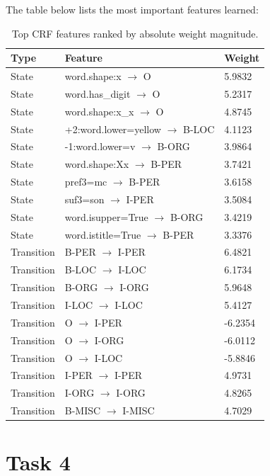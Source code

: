 \documentclass{report}
\begin{document}
The table below lists the most important features learned:

\begin{table}[h]
\centering
\small
\begin{tabular}{lll}
\hline
\textbf{Type} & \textbf{Feature} & \textbf{Weight} \\
\hline

State & word.shape:x $\rightarrow$ O & 5.9832 \\
State & word.has\_digit $\rightarrow$ O & 5.2317 \\
State & word.shape:x\_x $\rightarrow$ O & 4.8745 \\
State & +2:word.lower=yellow $\rightarrow$ B-LOC & 4.1123 \\
State & -1:word.lower=v $\rightarrow$ B-ORG & 3.9864 \\
State & word.shape:Xx $\rightarrow$ B-PER & 3.7421 \\
State & pref3=mc $\rightarrow$ B-PER & 3.6158 \\
State & suf3=son $\rightarrow$ I-PER & 3.5084 \\
State & word.isupper=True $\rightarrow$ B-ORG & 3.4219 \\
State & word.istitle=True $\rightarrow$ B-PER & 3.3376 \\

\hline
Transition & B-PER $\rightarrow$ I-PER & 6.4821 \\
Transition & B-LOC $\rightarrow$ I-LOC & 6.1734 \\
Transition & B-ORG $\rightarrow$ I-ORG & 5.9648 \\
Transition & I-LOC $\rightarrow$ I-LOC & 5.4127 \\
Transition & O $\rightarrow$ I-PER & -6.2354 \\
Transition & O $\rightarrow$ I-ORG & -6.0112 \\
Transition & O $\rightarrow$ I-LOC & -5.8846 \\
Transition & I-PER $\rightarrow$ I-PER & 4.9731 \\
Transition & I-ORG $\rightarrow$ I-ORG & 4.8265 \\
Transition & B-MISC $\rightarrow$ I-MISC & 4.7029 \\

\hline
\end{tabular}
\caption{Top CRF features ranked by absolute weight magnitude.}
\end{table}



\chapter{Task 4}
\end{document}
